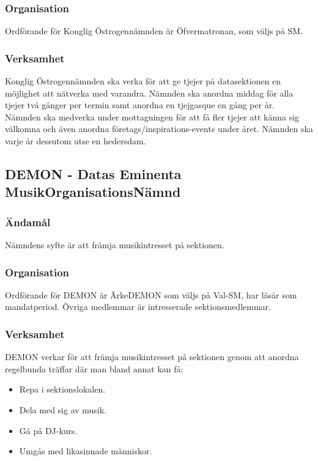 \documentclass{dgovdoc}
\begin{document}
\subsubsection{Organisation}

Ordförande för Konglig Östrogennämnden är Öfvermatronan, som väljs på SM.

\subsubsection{Verksamhet}

Konglig Östrogennämnden ska verka för att ge tjejer på datasektionen en
möjlighet att nätverka med varandra. Nämnden ska anordna middag för alla tjejer
två gånger per termin samt anordna en tjejgasque en gång per år. Nämnden ska
medverka under mottagningen för att få fler tjejer att känna sig välkomna och
även anordna företags/inspirations-events under året. Nämnden ska varje år
dessutom utse en hedersdam.

\subsection{DEMON - Datas Eminenta MusikOrganisationsNämnd}

\subsubsection{Ändamål}

Nämndens syfte är att främja musikintresset på sektionen.

\subsubsection{Organisation}

Ordförande för DEMON är ÄrkeDEMON som väljs på Val-SM, har läsår som
mandatperiod. Övriga medlemmar är intresserade sektionsmedlemmar.

\subsubsection{Verksamhet}

DEMON verkar för att främja musikintresset på sektionen genom att anordna
regelbunda träffar där man bland annat kan få:

\begin{itemize}
\item Repa i sektionslokalen.
\item Dela med sig av musik.
\item Gå på DJ-kurs.
\item Umgås med likasinnade människor.
\end{itemize}
\end{document}
